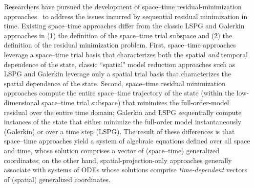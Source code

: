 \documentclass[3p,computermodern,10pt]{elsarticle}
\begin{document}
Researchers have pursued the development of space--time
residual-minimization approaches~\cite{choi_stlspg,constantine_strom,URBAN2012203,Yano2014ASC} to
address the issues incurred by sequential residual minimization in time.
Existing space--time approaches differ from the classic LSPG and Galerkin approaches in (1) the definition of the space--time trial subspace and (2) the definition of the residual minimization problem. 
First, space--time approaches leverage a space--time trial basis that characterizes both the spatial \textit{and} temporal dependence of the state, classic ``spatial" model reduction approaches such as LSPG and Galerkin leverage only a spatial trial basis that characterizes the spatial dependence of the state. 
Second, space--time residual minimization approaches compute the entire space--time trajectory of the state (within the low-dimensional space--time trial subspace) that minimizes the full-order-model residual over the entire time domain; Galerkin and LSPG sequentially compute instances of the state that either minimize the full-order model instantaneously (Galerkin) or over a time step (LSPG). 
The result of these differences is that space--time approaches yield a system of algebraic equations defined
over all space and time, whose solution comprises a vector of
(space--time) generalized coordinates; on the other hand, spatial-projection-only approaches 
generally associate with systems of ODEs whose solutions
comprise \textit{time-dependent} vectors of (spatial) generalized
coordinates.
\end{document}
